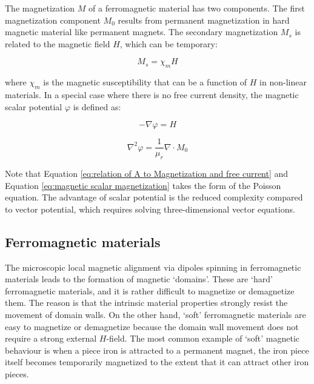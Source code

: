         
        The magnetization $M$ of a ferromagnetic material has two components. The first magnetization component $M_0$ results from permanent magnetization in hard magnetic material like permanent magnets. The secondary magnetization $M_s$ is related to the magnetic field $H$, which can be temporary:
        
        
        \begin{equation}
            M_s = \chi_m H
            \label{eq:secondary magnetization}
        \end{equation}     
        
        
        where $\chi_m$ is the magnetic susceptibility that can be a function of $H$ in non-linear materials. In a special case where there is no free current density, the magnetic scalar potential $\varphi$ is defined as:
        
        
        \begin{equation}
            - \nabla \varphi = H
            \label{eq:magnetic scalar and vector potential}
        \end{equation}     
        
        \begin{equation}
            \nabla^2 \varphi = \frac{1}{\mu_r} \nabla \cdot M_0
            \label{eq:magnetic scalar magnetization}
        \end{equation}     
        
        
        Note that Equation \ref{eq:relation of A to Magnetization and free current} and Equation \ref{eq:magnetic scalar magnetization} takes the form of the Poisson equation. The advantage of scalar potential is the reduced complexity compared to vector potential, which requires solving three-dimensional vector equations.
        
        
    \subsection{Ferromagnetic materials}                \label{Chapter:background/electromagnetic field theory/ferromagnetic material theory}
    
    
        The microscopic local magnetic alignment via dipoles spinning in ferromagnetic materials leads to the formation of magnetic ‘domains’. These are ‘hard’ ferromagnetic materials, and it is rather difficult to magnetize or demagnetize them. The reason is that the intrinsic material properties strongly resist the movement of domain walls. On the other hand, ‘soft’ ferromagnetic materials are easy to magnetize or demagnetize because the domain wall movement does not require a strong external $H$-field. The most common example of ‘soft’ magnetic behaviour is when a piece iron is attracted to a permanent magnet, the iron piece itself becomes temporarily magnetized to the extent that it can attract other iron pieces. 
        

